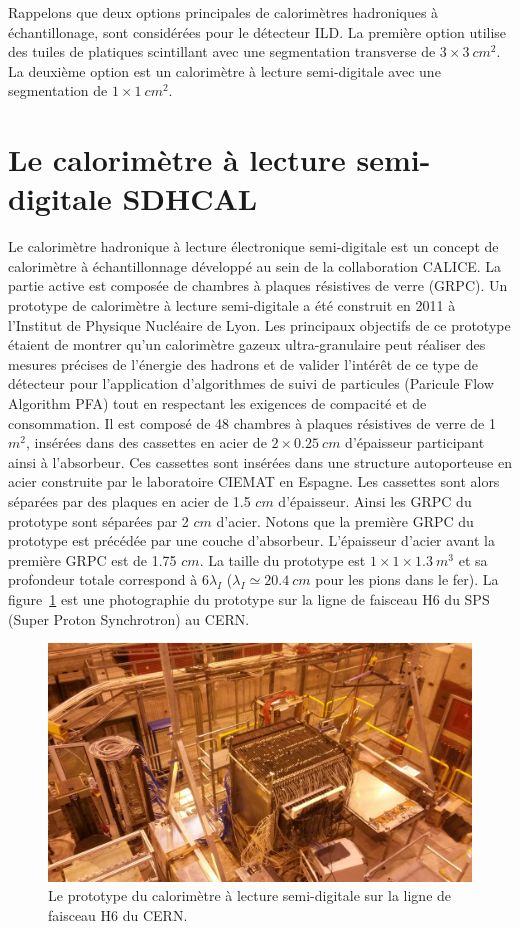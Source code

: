 Rappelons que deux options principales de calorimètres hadroniques à échantillonage, sont considérées pour le détecteur ILD. La première option utilise des tuiles de platiques scintillant avec une segmentation transverse de $3\times3~cm^2$. La deuxième option est un calorimètre à lecture semi-digitale avec une segmentation de $1\times1~cm^2$. 


\section{Le calorimètre à lecture semi-digitale SDHCAL}
Le calorimètre hadronique à lecture électronique semi-digitale \cite{sdhcal-com} est un concept de calorimètre à échantillonnage développé au sein de la collaboration CALICE. La partie active est composée de chambres à plaques résistives de verre (GRPC). Un prototype de calorimètre à lecture semi-digitale a été construit en 2011 à l’Institut de Physique Nucléaire de Lyon. Les principaux objectifs de ce prototype étaient de montrer qu'un calorimètre gazeux ultra-granulaire peut réaliser des mesures précises de l'énergie des hadrons et de valider l'intérêt de ce type de détecteur pour l'application d'algorithmes de suivi de particules (Paricule Flow Algorithm PFA) tout en respectant les exigences de compacité et de consommation. Il est composé de 48 chambres à plaques résistives de verre  de 1 $m^2$, insérées dans des cassettes en acier de $2\times0.25~cm$ d'épaisseur participant ainsi à l'absorbeur. Ces cassettes sont insérées dans une structure autoporteuse en acier construite par le laboratoire CIEMAT en Espagne. Les cassettes sont alors séparées par des plaques en acier de 1.5 $cm$ d'épaisseur. Ainsi les GRPC du prototype sont séparées par 2 $cm$ d'acier. Notons que la première GRPC du prototype est précédée par une couche d'absorbeur. L'épaisseur d'acier avant la première GRPC est de 1.75 $cm$. La taille du prototype est $1\times1\times1.3~m^3$ et sa profondeur totale correspond à 6$\lambda_I$ ($\lambda_I\simeq20.4~cm$ pour les pions dans le fer). La figure~\ref{fig:proto} est une photographie du prototype sur la ligne de faisceau H6 du SPS (Super Proton Synchrotron) au CERN.
\begin{figure}[!ht]
  \begin{center}
    \includegraphics[width=.8\textwidth]{SDHCAL/figs/proto.jpg}
    \caption{Le prototype du calorimètre à lecture semi-digitale sur la ligne de faisceau H6 du CERN.}
    \label{fig:proto}
  \end{center}
\end{figure}
